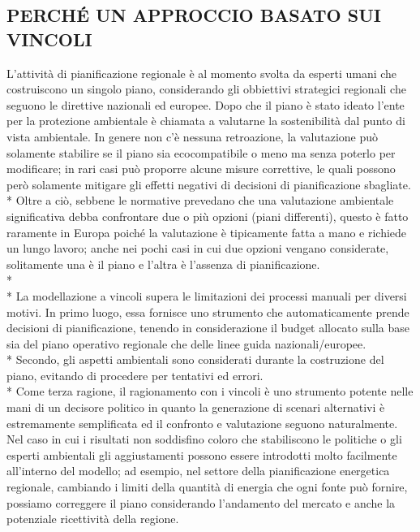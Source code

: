 \documentclass[12pt,a4paper,openright,twoside]{report}
\begin{document}
\subsection[APPROCCIO A VINCOLI]{\nohyphens{PERCHÉ UN APPROCCIO BASATO SUI VINCOLI}}
L'attività di pianificazione regionale è al momento svolta da esperti umani che costruiscono un singolo piano, considerando gli obbiettivi strategici regionali che seguono le direttive nazionali ed europee. Dopo che il piano è stato ideato l'ente per la protezione ambientale è chiamata a valutarne la sostenibilità dal punto di vista ambientale. In genere non c'è nessuna retroazione, la valutazione può solamente stabilire se il piano sia ecocompatibile o meno ma senza poterlo per modificare; in rari casi può proporre alcune misure correttive, le quali possono però solamente mitigare gli effetti negativi di decisioni di pianificazione sbagliate.\\* 
Oltre a ciò, sebbene le normative prevedano che una valutazione ambientale significativa debba confrontare due o più opzioni (piani differenti), questo è fatto raramente in Europa poiché la valutazione è tipicamente fatta a mano e richiede un lungo lavoro; anche nei pochi casi in cui due opzioni vengano considerate, solitamente una è il piano e l'altra è l'assenza di pianificazione.\\*\\*
La modellazione a vincoli supera le limitazioni dei processi manuali per diversi motivi. In primo luogo, essa fornisce uno strumento che automaticamente prende decisioni di pianificazione, tenendo in considerazione il budget allocato sulla base sia del piano operativo regionale che delle linee guida nazionali/europee.\\*
Secondo, gli aspetti ambientali sono considerati durante la costruzione del piano, evitando di procedere per tentativi ed errori.\\*
Come terza ragione, il ragionamento con i vincoli è uno strumento potente nelle mani di un decisore politico in quanto la generazione di scenari alternativi è estremamente semplificata ed il confronto e valutazione seguono naturalmente. Nel caso in cui i risultati non soddisfino coloro che stabiliscono le politiche o gli esperti ambientali gli aggiustamenti possono essere introdotti molto facilmente all'interno del modello; ad esempio, nel settore della pianificazione energetica regionale, cambiando i limiti della quantità di energia che ogni fonte può fornire, possiamo correggere il piano considerando l'andamento del mercato e anche la potenziale ricettività della regione.
\end{document}
